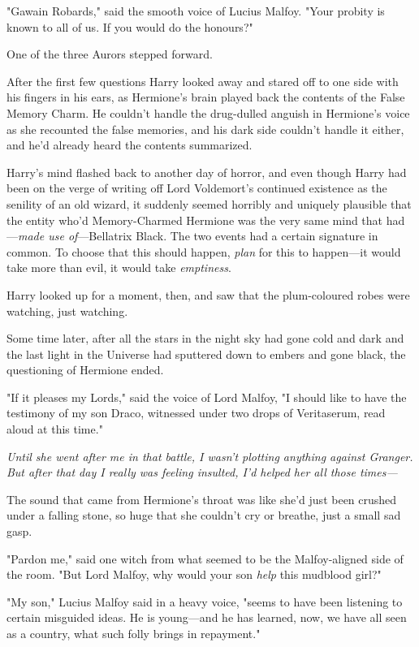 "Gawain Robards," said the smooth voice of Lucius Malfoy. "Your probity is
known to all of us. If you would do the honours?"

One of the three Aurors stepped forward.

After the first few questions Harry looked away and stared off to one side with
his fingers in his ears, as Hermione’s brain played back the contents of the
False Memory Charm. He couldn’t handle the drug-dulled anguish in Hermione’s
voice as she recounted the false memories, and his dark side couldn’t handle it
either, and he’d already heard the contents summarized.

Harry’s mind flashed back to another day of horror, and even though Harry had
been on the verge of writing off Lord Voldemort’s continued existence as the
senility of an old wizard, it suddenly seemed horribly and uniquely plausible
that the entity who’d Memory-Charmed Hermione was the very same mind that
had—\emph{made use of}—Bellatrix Black. The two events had a certain
signature in common. To choose that this should happen, \emph{plan} for this to
happen—it would take more than evil, it would take \emph{emptiness}.

Harry looked up for a moment, then, and saw that the plum-coloured robes were
watching, just watching.

Some time later, after all the stars in the night sky had gone cold and dark
and the last light in the Universe had sputtered down to embers and gone black,
the questioning of Hermione ended.

"If it pleases my Lords," said the voice of Lord Malfoy, "I should like to have
the testimony of my son Draco, witnessed under two drops of Veritaserum, read
aloud at this time."

\emph{Until she went after me in that battle, I wasn’t plotting anything
against Granger. But after that day I really was feeling insulted, I’d helped
her all those times—}

The sound that came from Hermione’s throat was like she’d just been crushed
under a falling stone, so huge that she couldn’t cry or breathe, just a small
sad gasp.

"Pardon me," said one witch from what seemed to be the Malfoy-aligned side of
the room. "But Lord Malfoy, why would your son \emph{help} this mudblood girl?"

"My son," Lucius Malfoy said in a heavy voice, "seems to have been listening to
certain misguided ideas. He is young—and he has learned, now, we have all
seen as a country, what such folly brings in repayment."

